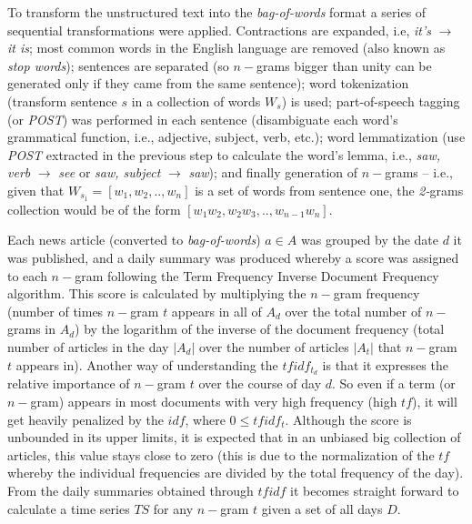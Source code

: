 \documentclass[conference,11pt]{IEEEtran}
\begin{document}
\par
To transform the unstructured text into the \textit{bag-of-words} format a series of sequential transformations were applied. Contractions are expanded, i.e, \textit{it's} \(\to\) \textit{it is}; most common words in the English language are removed (also known as \textit{stop words}); sentences are separated (so \(n-\)grams bigger than unity can be generated only if they came from the same sentence); word tokenization (transform sentence \(s\) in a collection of words \(W_s\)) is used; part-of-speech tagging (or \textit{POST}) was performed in each sentence (disambiguate each word's grammatical function, i.e., adjective, subject, verb, etc.); word lemmatization (use \textit{POST} extracted in the previous step to calculate the word's lemma, i.e., \textit{saw, verb} \(\to\) \textit{see} or \textit{saw, subject} \(\to\) \textit{saw}); and finally generation of \(n-\)grams -- i.e., given that \(W_{s_1}=[w_1,w_2,..,w_n]\) is a set of words from sentence one, the \textit{2-}grams collection would be of the form \([w_1 w_2,w_2 w_3,..,w_{n-1} w_n]\).

\par
Each news article (converted to \textit{bag-of-words}) \(a \in A\) was grouped by the date \(d\) it was published, and a daily summary was produced whereby a score was assigned to each \(n-\)gram following the Term Frequency Inverse Document Frequency algorithm. This score is calculated by multiplying the \(n-\)gram frequency (number of times \(n-\)gram \(t\) appears in all of \(A_d\) over the total number of \(n-\)grams in \(A_d\)) by the logarithm of the inverse of the document frequency (total number of articles in the day \(\vert A_d \vert\) over the number of articles \(\vert A_t \vert\) that \(n-\)gram \(t\) appears in). Another way of understanding the \(tfidf_{t_d}\) is that it expresses the relative importance of \(n-\)gram \(t\) over the course of day \(d\). So even if a term (or \(n-\)gram) appears in most documents with very high frequency (high \(tf\)), it will get heavily penalized by the \(idf\), where \(0 \leq tfidf_t\). Although the score is unbounded in its upper limits, it is expected that in an unbiased big collection of articles, this value stays close to zero (this is due to the normalization of the \(tf\) whereby the individual frequencies are divided by the total frequency of the day).
From the daily summaries obtained through \(tfidf\) it becomes straight forward to calculate a time series \(TS\) for any \(n-\)gram \(t\) given a set of all days \(D\).
\end{document}
